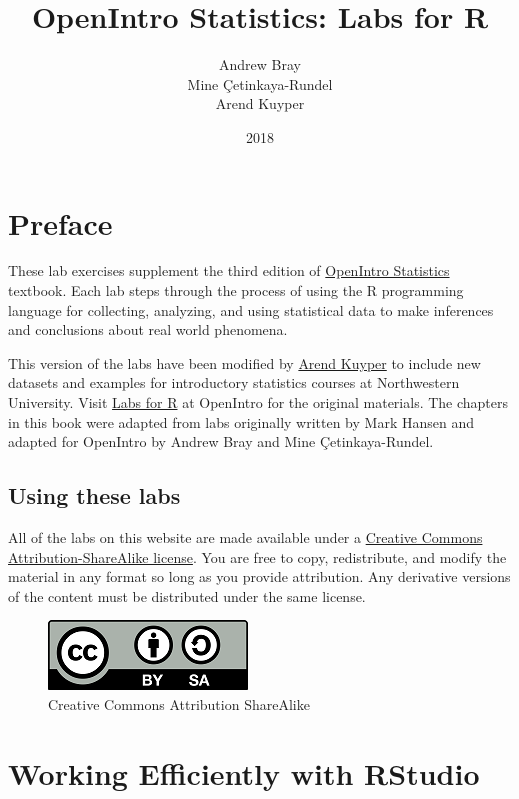 \documentclass[]{book}
\title{OpenIntro Statistics: Labs for R}
\author{Andrew Bray \\ Mine Çetinkaya-Rundel \\ Arend Kuyper}
\date{2018}
\theoremstyle{definition}
\theoremstyle{definition}
\theoremstyle{definition}
\theoremstyle{remark}
\begin{document}
\maketitle

{
\setcounter{tocdepth}{1}
\tableofcontents
}
\chapter*{Preface}\label{preface}

These lab exercises supplement the third edition of
\href{https://www.openintro.org/stat/index.php}{OpenIntro Statistics}
textbook. Each lab steps through the process of using the R programming
language for collecting, analyzing, and using statistical data to make
inferences and conclusions about real world phenomena.

This version of the labs have been modified by
\href{https://www.statistics.northwestern.edu/people/faculty/arend-m-kuyper.html}{Arend
Kuyper} to include new datasets and examples for introductory statistics
courses at Northwestern University. Visit
\href{https://www.openintro.org/stat/labs.php}{Labs for R} at OpenIntro
for the original materials. The chapters in this book were adapted from
labs originally written by Mark Hansen and adapted for OpenIntro by
Andrew Bray and Mine Çetinkaya-Rundel.

\section{Using these labs}\label{using-these-labs}

All of the labs on this website are made available under a
\href{https://creativecommons.org/licenses/by-sa/3.0/}{Creative Commons
Attribution-ShareAlike license}. You are free to copy, redistribute, and
modify the material in any format so long as you provide attribution.
Any derivative versions of the content must be distributed under the
same license.

\begin{figure}
\centering
\includegraphics{./assets/images/by-sa.png}
\caption{Creative Commons Attribution ShareAlike}
\end{figure}

\chapter{Working Efficiently with
RStudio}\label{working-efficiently-with-rstudio}
\end{document}
